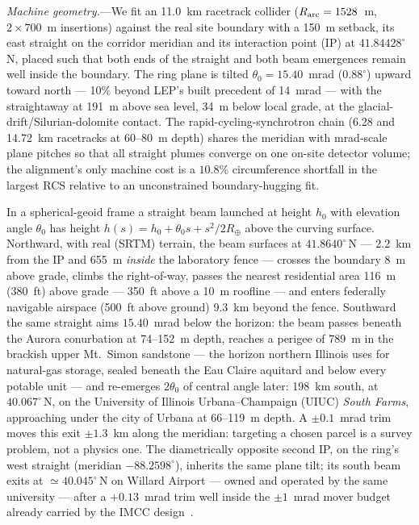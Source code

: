 \documentclass[aps,prl,reprint,superscriptaddress,nofootinbib]{revtex4-2}
\begin{document}
\emph{Machine geometry.}---We fit an 11.0~km racetrack collider
($R_{\rm arc}=1528$~m, $2\times700$~m insertions) against the real site
boundary with a 150~m setback, its east straight on the corridor meridian
and its interaction point (IP) at $41.84428^\circ$\,N, placed such that
both ends of the straight and both beam emergences remain well inside the
boundary. The ring plane is tilted $\theta_0 = 15.40$~mrad
($0.88^\circ$) upward toward north --- 10\% beyond LEP's built precedent
of 14~mrad --- with the straightaway at 191~m above sea level, 34~m below
local grade, at the glacial-drift/Silurian-dolomite contact. The rapid-cycling-synchrotron
chain (6.28 and 14.72~km racetracks at 60--80~m depth) shares the
meridian with mrad-scale plane pitches so that all straight plumes
converge on one on-site detector volume; the alignment's only machine
cost is a $10.8\%$ circumference shortfall in the largest RCS relative to
an unconstrained boundary-hugging fit.

In a spherical-geoid frame a straight beam launched at height $h_0$ with
elevation angle $\theta_0$ has height
$h(s)=h_0+\theta_0 s+s^{2}/2R_\oplus$ above the curving surface. Northward,
with real (SRTM) terrain, the beam surfaces at $41.8640^\circ$\,N ---
2.2~km from the IP and 655~m \emph{inside} the laboratory fence --- crosses
the boundary 8~m above grade, climbs the right-of-way, passes the nearest
residential area 116~m (380~ft) above grade --- 350~ft above a 10~m
roofline --- and enters federally navigable airspace (500~ft above ground)
9.3~km beyond the fence.
Southward the same straight aims $15.40$~mrad below the horizon: the beam
passes beneath the Aurora conurbation at 74--152~m depth, reaches a
perigee of 789~m in the brackish upper Mt.~Simon sandstone --- the horizon
northern Illinois uses for natural-gas storage, sealed beneath the Eau
Claire aquitard and below every potable unit --- and re-emerges
$2\theta_0$ of central angle later: 198~km south, at $40.067^\circ$\,N,
on the University of Illinois Urbana--Champaign (UIUC) \emph{South Farms},
approaching under the city of Urbana at 66--119~m depth. A
$\pm0.1$~mrad trim moves this exit $\pm1.3$~km along the meridian:
targeting a chosen parcel is a survey problem, not a physics one. The
diametrically opposite second IP, on the ring's west straight (meridian
$-88.2598^\circ$), inherits the same plane tilt; its south beam exits at
${\simeq}40.045^\circ$\,N on Willard Airport --- owned and operated by the
same university --- after a $+0.13$~mrad trim well inside the
$\pm1$~mrad mover budget already carried by the IMCC design~\cite{IMCC}.
\end{document}
